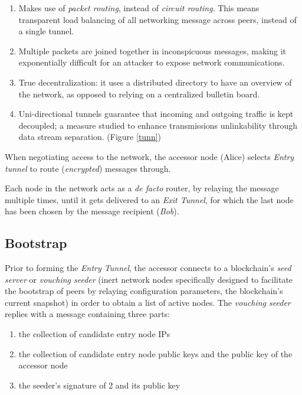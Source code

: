 \begin{enumerate}
\def\labelenumi{\arabic{enumi}.}
\item
  Makes use of \emph{packet routing}, instead of \emph{circuit routing}.
  This means transparent load balancing of all networking message across
  peers, instead of a single tunnel.
\item
  Multiple packets are joined together in inconspicuous messages, making
  it exponentially difficult for an attacker to expose network
  communications.
\item
  True decentralization: it uses a distributed directory to have an
  overview of the network, as opposed to relying on a centralized
  bulletin board.
\item
  Uni-directional tunnels guarantee that incoming and outgoing traffic
  is kept decoupled; a measure studied to enhance transmissions
  unlinkability through data stream separation. (Figure \ref{tunn})
\end{enumerate}

When negotiating access to the network, the accessor node (Alice)
selects \emph{Entry tunnel} to route (\emph{encrypted}) messages
through.

Each node in the network acts as a \emph{de facto} router, by relaying
the message multiple times, until it gets delivered to an \emph{Exit
Tunnel}, for which the last node has been chosen by the message
recipient (\emph{Bob}).

\subsection{Bootstrap}

Prior to forming the \emph{Entry Tunnel}, the accessor connects to a
blockchain's \emph{seed server} or \emph{vouching seeder} (inert network
nodes specifically designed to facilitate the bootstrap of peers by
relaying configuration parameters, the blockchain's current snapshot) in
order to obtain a list of active nodes. The \emph{vouching seeder}
replies with a message containing three parts:

\begin{enumerate}
\def\labelenumi{\arabic{enumi}.}
\item
  the collection of candidate entry node IPs
\item
  the collection of candidate entry node public keys and the public key
  of the accessor node
\item
  the seeder's signature of 2 and its public key
\end{enumerate}

